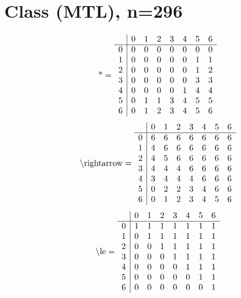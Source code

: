 \documentclass[11pt]{article}
\begin{document}
\section{Class (MTL), n=296}
\[\text{*} = 
\begin{array}{r | r r r r r r r}
 & 0 & 1 & 2 & 3 & 4 & 5 & 6 \\ \hline
0 & 0 & 0 & 0 & 0 & 0 & 0 & 0 \\
1 & 0 & 0 & 0 & 0 & 0 & 1 & 1 \\
2 & 0 & 0 & 0 & 0 & 0 & 1 & 2 \\
3 & 0 & 0 & 0 & 0 & 0 & 3 & 3 \\
4 & 0 & 0 & 0 & 0 & 1 & 4 & 4 \\
5 & 0 & 1 & 1 & 3 & 4 & 5 & 5 \\
6 & 0 & 1 & 2 & 3 & 4 & 5 & 6 \\
\end{array}
\]
\[\text{\textbackslash rightarrow} = 
\begin{array}{r | r r r r r r r}
 & 0 & 1 & 2 & 3 & 4 & 5 & 6 \\ \hline
0 & 6 & 6 & 6 & 6 & 6 & 6 & 6 \\
1 & 4 & 6 & 6 & 6 & 6 & 6 & 6 \\
2 & 4 & 5 & 6 & 6 & 6 & 6 & 6 \\
3 & 4 & 4 & 4 & 6 & 6 & 6 & 6 \\
4 & 3 & 4 & 4 & 4 & 6 & 6 & 6 \\
5 & 0 & 2 & 2 & 3 & 4 & 6 & 6 \\
6 & 0 & 1 & 2 & 3 & 4 & 5 & 6 \\
\end{array}
\]
\[\text{\textbackslash le} = 
\begin{array}{r | r r r r r r r}
 & 0 & 1 & 2 & 3 & 4 & 5 & 6 \\ \hline
0 & 1 & 1 & 1 & 1 & 1 & 1 & 1 \\
1 & 0 & 1 & 1 & 1 & 1 & 1 & 1 \\
2 & 0 & 0 & 1 & 1 & 1 & 1 & 1 \\
3 & 0 & 0 & 0 & 1 & 1 & 1 & 1 \\
4 & 0 & 0 & 0 & 0 & 1 & 1 & 1 \\
5 & 0 & 0 & 0 & 0 & 0 & 1 & 1 \\
6 & 0 & 0 & 0 & 0 & 0 & 0 & 1 \\
\end{array}
\]
\end{document}
